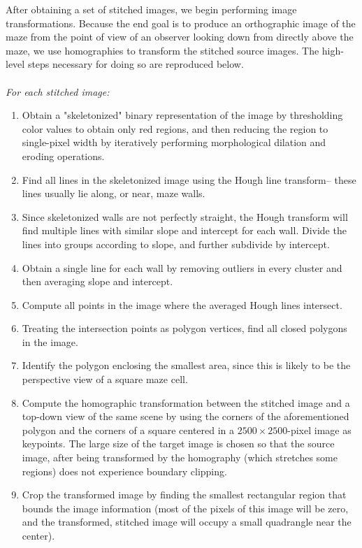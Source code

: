 \documentclass[10pt,twocolumn,letterpaper]{article}
\begin{document}
After obtaining a set of stitched images, we begin performing image transformations.  Because the end goal is to produce
an orthographic image of the maze from the point of view of an observer looking down from directly above the maze, we
use homographies to transform the stitched source images.  The high-level steps necessary for doing so are reproduced
below.
\\
\\
\textit{For each stitched image:}
\begin{enumerate}
	\item Obtain a "skeletonized" binary representation of the image by thresholding color values to obtain only red
	regions, and then reducing the region to single-pixel width by iteratively performing morphological dilation and
	eroding operations.
	\item Find all lines in the skeletonized image using the Hough line transform-- these lines usually lie along, or
	near, maze walls.
	\item Since skeletonized walls are not perfectly straight, the Hough transform will find multiple lines with similar
	slope and intercept for each wall.  Divide the lines into groups according to slope, and further subdivide by
	intercept.
	\item Obtain a single line for each wall by removing outliers in every cluster and then averaging slope and
	intercept.
	\item Compute all points in the image where the averaged Hough lines intersect.
	\item Treating the intersection points as polygon vertices, find all closed polygons in the image.
	\item Identify the polygon enclosing the smallest area, since this is likely to be the perspective view of a square
	maze cell.
	\item Compute the homographic transformation between the stitched image and a top-down view of the same scene by
	using the corners of the aforementioned polygon and the corners of a square centered in a $2500\times 2500$-pixel
	image as keypoints.  The large size of the target image is chosen so that the source image, after being transformed
	by the homography (which stretches some regions) does not experience boundary clipping.
	\item Crop the transformed image by finding the smallest rectangular region that bounds the image information (most
	of the pixels of this image will be zero, and the transformed, stitched image will occupy a small quadrangle near
	the center).
\end{enumerate}
\end{document}
